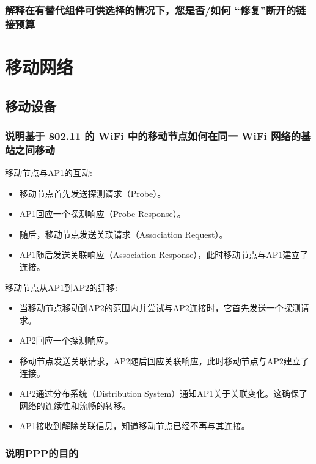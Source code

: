 \subsection{解释在有替代组件可供选择的情况下，您是否/如何 ``修复''断开的链接预算}


\chapter{移动网络}

\section{移动设备}

\subsection{说明基于 802.11 的 WiFi 中的移动节点如何在同一 WiFi 网络的基站之间移动}

移动节点与AP1的互动:

\begin{itemize}
	\item 移动节点首先发送探测请求（Probe）。
	\item AP1回应一个探测响应（Probe Response）。
	\item 随后，移动节点发送关联请求（Association Request）。
	\item AP1随后发送关联响应（Association Response），此时移动节点与AP1建立了连接。

\end{itemize}

移动节点从AP1到AP2的迁移:

\begin{itemize}
	\item 当移动节点移动到AP2的范围内并尝试与AP2连接时，它首先发送一个探测请求。
	\item AP2回应一个探测响应。
	\item 移动节点发送关联请求，AP2随后回应关联响应，此时移动节点与AP2建立了连接。
	\item AP2通过分布系统（Distribution System）通知AP1关于关联变化。这确保了网络的连续性和流畅的转移。
	\item AP1接收到解除关联信息，知道移动节点已经不再与其连接。
\end{itemize}

\subsection{说明PPP的目的}

